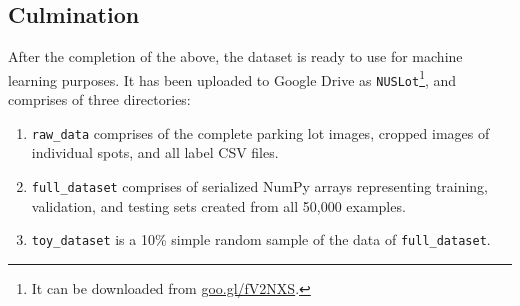 \documentclass[a4paper, 11pt]{article} %
\begin{document}
	\subsection{Culmination}
		After the completion of the above, the dataset is ready to use for 
		machine learning purposes. It
		has been uploaded to Google Drive as \texttt{NUSLot}\footnote{It can be 
		downloaded from \hyperlink{https://goo.gl/fV2NXS}{goo.gl/fV2NXS}.}, and 
		comprises of 
		three directories:
		\begin{enumerate}
			\item \texttt{raw\_data} comprises of the complete parking lot 
			images, cropped images of individual spots, and all label CSV files.
			\item \texttt{full\_dataset} comprises of serialized NumPy arrays 
			representing
			training, validation, and testing sets created from all 50,000 examples. 
			\item \texttt{toy\_dataset} is a 10\% simple random sample of the 
			data of
			\texttt{full\_dataset}.
		\end{enumerate}
\end{document}
